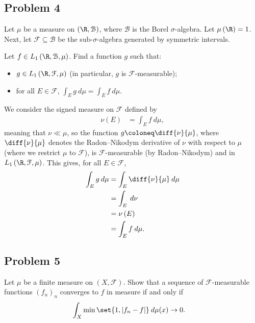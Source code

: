 \documentclass[10pt]{mypackage}
\begin{document}
\subsection{Problem 4}%
\begin{problem}
  Let $\mu$ be a measure on $\left( \R,\mathcal{B} \right)$, where $\mathcal{B}$ is the Borel $\sigma$-algebra. Let $\mu\left( \R \right) = 1$. Next, let $\mathcal{F}\subseteq \mathcal{B}$ be the sub-$\sigma$-algebra generated by symmetric intervals.\newline

  Let $f\in L_1\left( \R,\mathcal{B},\mu \right)$. Find a function $g$ such that:
  \begin{itemize}
    \item $g\in L_1\left( \R,\mathcal{F},\mu \right)$ (in particular, $g$ is $\mathcal{F}$-measurable);
    \item for all $E\in \mathcal{F}$, $ \int_{E}^{} g\:d\mu = \int_{E}^{} f\:d\mu $.
  \end{itemize}
\end{problem}
We consider the signed measure on $ \mathcal{F} $ defined by
\begin{align*}
  \nu(E) &= \int_{E}^{} f\:d\mu,
\end{align*}
meaning that $\nu\ll \mu$, so the function $g \coloneq \diff{\nu}{\mu}$, where $\diff{\nu}{\mu}$ denotes the Radon--Nikodym derivative of $\nu$ with respect to $\mu$ (where we restrict $\mu$ to $\mathcal{F}$), is $\mathcal{F}$-measurable (by Radon--Nikodym) and in $L_1\left( \R,\mathcal{F},\mu \right)$. This gives, for all $E\in \mathcal{F}$,
\begin{align*}
  \int_{E}^{} g\:d\mu &= \int_{E}^{} \diff{\nu}{\mu}\:d\mu\\
                      &= \int_{E}^{} \:d\nu\\
                      &= \nu\left( E \right)\\
                      &= \int_{E}^{} f\:d\mu.
\end{align*}
\subsection{Problem 5}%
\begin{problem}
  Let $\mu$ be a finite measure on $\left( X,\mathcal{F} \right)$. Show that a sequence of $\mathcal{F}$-measurable functions $\left( f_n \right)_n$ converges to $f$ in measure if and only if
  \begin{align*}
    \int_{X}^{} \min\set{1,\left\vert f_n-f \right\vert}\:d\mu(x) &\rightarrow 0.
  \end{align*}
\end{problem}
\end{document}

